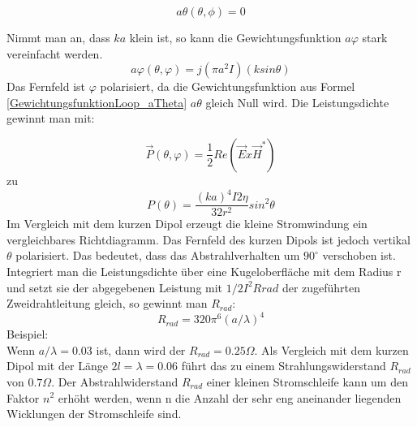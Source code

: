 \begin{equation}\label{GewichtungsfunktionLoop_aTheta}
a\theta(\theta, \phi) =0
\end{equation}

Nimmt man  an, dass $ka$ klein ist, so kann  die Gewichtungsfunktion $a\varphi$ stark vereinfacht werden.
\begin{equation}
a\varphi(\theta,\varphi)=j(\pi a^{2}I)(k sin \theta)
\end{equation}
Das Fernfeld   ist  $\varphi$ polarisiert, da die Gewichtungsfunktion aus Formel \ref{GewichtungsfunktionLoop_aTheta}  $a\theta$ gleich Null wird.  Die Leistungsdichte gewinnt man mit: 

\begin{equation}
\vec P(\theta,\varphi)=\frac{1}{2}Re(\vec E x \vec H^*)
\end{equation}
zu
\begin{equation}
P(\theta)=\frac{(ka)^{4}I{2}\eta}{32r^{2}}sin^{2}\theta
\end{equation}
Im Vergleich mit dem kurzen Dipol erzeugt die kleine Stromwindung ein vergleichbares Richtdiagramm. Das Fernfeld des kurzen Dipols ist jedoch vertikal $\theta$ polarisiert. Das bedeutet, dass das Abstrahlverhalten um $90^\circ$ verschoben ist. Integriert man die Leistungsdichte über eine Kugeloberfläche mit dem Radius r  und setzt sie der abgegebenen Leistung mit $1/2 I^{2}Rrad $ der zugeführten Zweidrahtleitung gleich, so gewinnt man $R_{rad}$:
\begin{equation}
R_{rad} = 320\pi^{6} (a/\lambda)^{4}\label{eq:RradLoop}
\end{equation}
Beispiel:\\
Wenn $a/\lambda = 0.03$ ist, dann wird der $R_{rad} = 0.25\Omega$. Als Vergleich mit dem kurzen Dipol mit der Länge $2l=\lambda= 0.06$ führt das zu einem Strahlungswiderstand $R_{rad}$ von $0.7\Omega$.  Der Abstrahlwiderstand $R_{rad}$ einer kleinen Stromschleife kann um den Faktor $n^{2}$ erhöht werden, wenn n die Anzahl der sehr eng aneinander liegenden Wicklungen der Stromschleife sind. 



